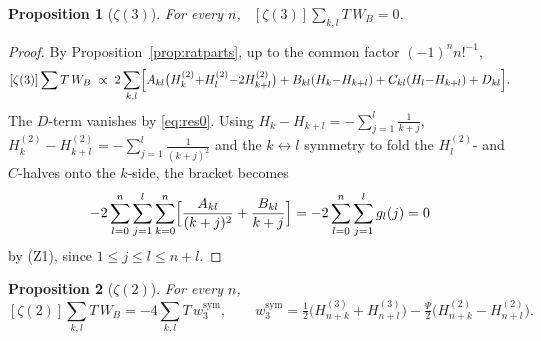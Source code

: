 \documentclass[11pt]{article}
\newtheorem{proposition}{Proposition}
\theoremstyle{remark}
\newcommand{\Hh}[2]{H_{#1}^{(#2)}}
\begin{document}
\begin{proposition}[$\zeta(3)$]\label{prop:z3}
For every $n$, \ $[\zeta(3)]\sum_{k,l}T\,W_B=0$.
\end{proposition}

\begin{proof}
By Proposition~\ref{prop:ratparts}, up to the common factor
$(-1)^nn!^{-1}$,
\[
 [\zeta(3)]\sum T\,W_B
 \;\propto\;
 2\sum_{k,l}\Bigl[
 A_{kl}\bigl(\Hh k2{+}\Hh l2{-}2\Hh{k+l}2\bigr)
 +B_{kl}(H_k{-}H_{k+l})
 +C_{kl}(H_l{-}H_{k+l})
 +D_{kl}\Bigr].
\]
The $D$-term vanishes by \eqref{eq:res0}.  Using
$H_k-H_{k+l}=-\sum_{j=1}^{l}\frac1{k+j}$,
$\Hh k2-\Hh{k+l}2=-\sum_{j=1}^{l}\frac1{(k+j)^2}$ and the
$k\leftrightarrow l$ symmetry to fold the $\Hh l2$- and $C$-halves onto the
$k$-side, the bracket becomes
\[
 -2\sum_{l=0}^n\sum_{j=1}^{l}\sum_{k=0}^n
 \Bigl[\frac{A_{kl}}{(k+j)^2}+\frac{B_{kl}}{k+j}\Bigr]
 =-2\sum_{l=0}^n\sum_{j=1}^{l}g_l(j)=0
\]
by (Z1), since $1\le j\le l\le n+l$.
\end{proof}

\begin{proposition}[$\zeta(2)$]\label{prop:z2}
For every $n$,
\[
 [\zeta(2)]\sum_{k,l}T\,W_B=-4\sum_{k,l}T\,w_3^{\mathrm{sym}},
 \qquad
 w_3^{\mathrm{sym}}
 =\tfrac12\bigl(\Hh{n+k}3+\Hh{n+l}3\bigr)
 -\tfrac\Psi2\bigl(\Hh{n+k}2-\Hh{n+l}2\bigr).
\]
\end{proposition}
\end{document}

